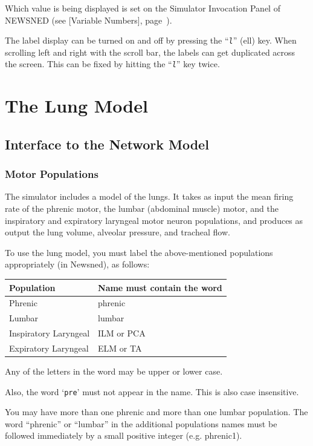 \documentclass[12pt,openany,oneside]{book}
\newcommand{\tisamp}[1]{`\texttt{#1}'}
\newcommand{\tikbd}[1]{\textsl{\texttt{#1}}}
\newcommand{\tipxref}[1]{see [#1], page~\pageref{#1}}
\begin{document}
Which value is being displayed is set on the Simulator Invocation
Panel of NEWSNED (\tipxref{Variable Numbers}).

The label display can be turned on and off by pressing the ``\tikbd{l}''
(ell) key.  When scrolling left and right with the scroll bar, the
labels can get duplicated across the screen.  This can be fixed by
hitting the ``\tikbd{l}'' key twice.

\section{The Lung Model}


\subsection{Interface to the Network Model}

\subsubsection{Motor Populations}

The simulator includes a model of the lungs.  It takes as input the mean
firing rate of the phrenic motor, the lumbar (abdominal muscle)
motor, and the inspiratory and expiratory laryngeal motor neuron
populations, and produces as output the lung volume, alveolar pressure,
and tracheal flow.

To use the lung model, you must label the above-mentioned populations
appropriately (in Newsned), as follows:

\begin{flushleft}
\begin{tabular}{@{}ll@{}}
Population & Name must contain the word\\
\hline\noalign{\smallskip}
Phrenic & phrenic\\
Lumbar  & lumbar\\
Inspiratory Laryngeal & ILM or PCA\\
Expiratory Laryngeal & ELM or TA\\
\end{tabular}
\end{flushleft}

\noindent
Any of the letters in the word may be upper or lower case.

\noindent
Also, the word \tisamp{pre} must not appear in the name.  This is also
case insensitive.

You may have more than one phrenic and more than one lumbar population.
The word ``phrenic'' or ``lumbar'' in the additional populations names
must be followed immediately by a small positive integer
(e.g. phrenic1).
\end{document}
